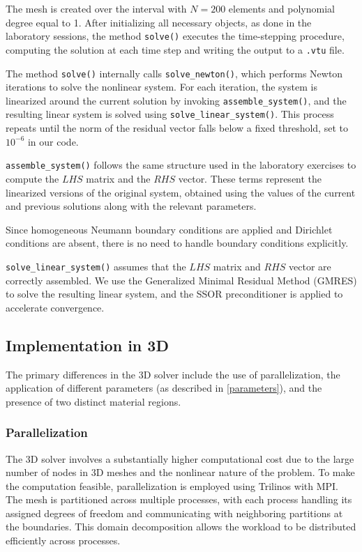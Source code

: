 \documentclass[12pt, a4paper, twoside, openright]{report}
\begin{document}
The mesh is created over the interval with \(N = 200\) elements and polynomial degree equal to 1. After initializing all necessary objects, as done in the laboratory sessions, the method \texttt{solve()} executes the time-stepping procedure, computing the solution at each time step and writing the output to a \verb|.vtu| file.

The method \texttt{solve()} internally calls \texttt{solve\_newton()}, which performs Newton iterations to solve the nonlinear system. For each iteration, the system is linearized around the current solution by invoking \texttt{assemble\_system()}, and the resulting linear system is solved using \texttt{solve\_linear\_system()}. This process repeats until the norm of the residual vector falls below a fixed threshold, set to \(10^{-6}\) in our code.

\texttt{assemble\_system()} follows the same structure used in the laboratory exercises to compute the $LHS$ matrix and the $RHS$ vector. These terms represent the linearized versions of the original system, obtained using the values of the current and previous solutions along with the relevant parameters.

Since homogeneous Neumann boundary conditions are applied and Dirichlet conditions are absent, there is no need to handle boundary conditions explicitly.

\texttt{solve\_linear\_system()} assumes that the $LHS$ matrix and $RHS$ vector are correctly assembled. We use the Generalized Minimal Residual Method (GMRES) to solve the resulting linear system, and the SSOR preconditioner is applied to accelerate convergence.

\subsection{Implementation in 3D}

The primary differences in the 3D solver include the use of parallelization, the application of different parameters (as described in \autoref{parameters}), and the presence of two distinct material regions.

\subsubsection{Parallelization}

The 3D solver involves a substantially higher computational cost due to the large number of nodes in 3D meshes and the nonlinear nature of the problem. To make the computation feasible, parallelization is employed using Trilinos with MPI. The mesh is partitioned across multiple processes, with each process handling its assigned degrees of freedom and communicating with neighboring partitions at the boundaries. This domain decomposition allows the workload to be distributed efficiently across processes.
\end{document}
